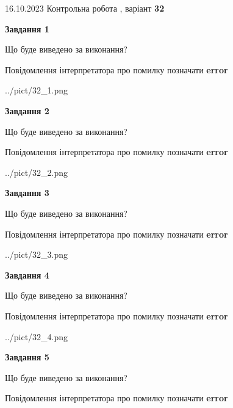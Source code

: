 \documentclass[12pt, ukrainian]{article}
\begin{document}
{\Large{16.10.2023 Контрольна робота , варіант  \No \textbf { 32 }\par}}
{
\begin {large}
{\begin {center}\textbf{Завдання 1}\end {center}}\par
Що буде виведено за виконання? \par
Повідомлення інтерпретатора про помилку позначати \textbf{error}

\begin{center}
	{../pict/32_1.png}
\end{center}
\newpage

{\begin {center}\textbf{Завдання 2}\end {center}}\par
Що буде виведено за виконання? \par
Повідомлення інтерпретатора про помилку позначати \textbf{error}

\begin{center}
	{../pict/32_2.png}
\end{center}
\newpage

{\begin {center}\textbf{Завдання 3}\end {center}}\par
Що буде виведено за виконання? \par
Повідомлення інтерпретатора про помилку позначати \textbf{error}

\begin{center}
	{../pict/32_3.png}
\end{center}
\newpage

{\begin {center}\textbf{Завдання 4}\end {center}}\par
Що буде виведено за виконання? \par
Повідомлення інтерпретатора про помилку позначати \textbf{error}

\begin{center}
	{../pict/32_4.png}
\end{center}
\newpage

{\begin {center}\textbf{Завдання 5}\end {center}}\par
Що буде виведено за виконання? \par
Повідомлення інтерпретатора про помилку позначати \textbf{error}


\end{large}}
\end{document}
